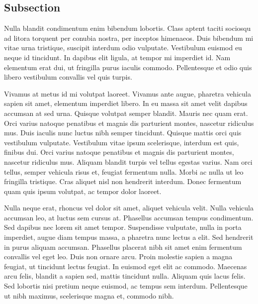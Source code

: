 \subsection*{Subsection}

Nulla blandit condimentum enim bibendum lobortis. Class aptent taciti sociosqu ad litora torquent per conubia nostra, per inceptos himenaeos. Duis bibendum mi vitae urna tristique, suscipit interdum odio vulputate. Vestibulum euismod eu neque id tincidunt. In dapibus elit ligula, at tempor mi imperdiet id. Nam elementum erat dui, ut fringilla purus iaculis commodo. Pellentesque et odio quis libero vestibulum convallis vel quis turpis.

Vivamus at metus id mi volutpat laoreet. Vivamus ante augue, pharetra vehicula sapien sit amet, elementum imperdiet libero. In eu massa sit amet velit dapibus accumsan at sed urna. Quisque volutpat semper blandit. Mauris nec quam erat. Orci varius natoque penatibus et magnis dis parturient montes, nascetur ridiculus mus. Duis iaculis nunc luctus nibh semper tincidunt. Quisque mattis orci quis vestibulum vulputate. Vestibulum vitae ipsum scelerisque, interdum est quis, finibus dui. Orci varius natoque penatibus et magnis dis parturient montes, nascetur ridiculus mus. Aliquam blandit turpis vel tellus egestas varius. Nam orci tellus, semper vehicula risus et, feugiat fermentum nulla. Morbi ac nulla ut leo fringilla tristique. Cras aliquet nisl non hendrerit interdum. Donec fermentum quam quis ipsum volutpat, ac tempor dolor laoreet.



Nulla neque erat, rhoncus vel dolor sit amet, aliquet vehicula velit. Nulla vehicula accumsan leo, at luctus sem cursus at. Phasellus accumsan tempus condimentum. Sed dapibus nec lorem sit amet tempor. Suspendisse vulputate, nulla in porta imperdiet, augue diam tempus massa, a pharetra nunc lectus a elit. Sed hendrerit in purus aliquam accumsan. Phasellus placerat nibh sit amet enim fermentum convallis vel eget leo. Duis non ornare arcu. Proin molestie sapien a magna feugiat, ut tincidunt lectus feugiat. In euismod eget elit ac commodo. Maecenas arcu felis, blandit a sapien sed, mattis tincidunt nulla. Aliquam quis lacus felis. Sed lobortis nisi pretium neque euismod, ac tempus sem interdum. Pellentesque ut nibh maximus, scelerisque magna et, commodo nibh. 



